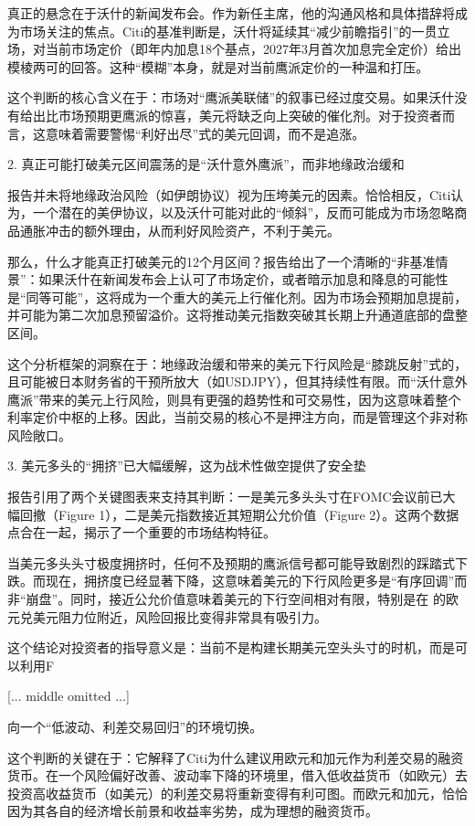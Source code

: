 \documentclass[11pt]{ctexart}
\begin{document}
真正的悬念在于沃什的新闻发布会。作为新任主席，他的沟通风格和具体措辞将成为市场关注的焦点。Citi的基准判断是，沃什将延续其“减少前瞻指引”的一贯立场，对当前市场定价（即年内加息18个基点，2027年3月首次加息完全定价）给出模棱两可的回答。这种“模糊”本身，就是对当前鹰派定价的一种温和打压。

这个判断的核心含义在于：市场对“鹰派美联储”的叙事已经过度交易。如果沃什没有给出比市场预期更鹰派的惊喜，美元将缺乏向上突破的催化剂。对于投资者而言，这意味着需要警惕“利好出尽”式的美元回调，而不是追涨。

2. 真正可能打破美元区间震荡的是“沃什意外鹰派”，而非地缘政治缓和

报告并未将地缘政治风险（如伊朗协议）视为压垮美元的因素。恰恰相反，Citi认为，一个潜在的美伊协议，以及沃什可能对此的“倾斜”，反而可能成为市场忽略商品通胀冲击的额外理由，从而利好风险资产，不利于美元。

那么，什么才能真正打破美元的12个月区间？报告给出了一个清晰的“非基准情景”：如果沃什在新闻发布会上认可了市场定价，或者暗示加息和降息的可能性是“同等可能”，这将成为一个重大的美元上行催化剂。因为市场会预期加息提前，并可能为第二次加息预留溢价。这将推动美元指数突破其长期上升通道底部的盘整区间。

这个分析框架的洞察在于：地缘政治缓和带来的美元下行风险是“膝跳反射”式的，且可能被日本财务省的干预所放大（如USDJPY），但其持续性有限。而“沃什意外鹰派”带来的美元上行风险，则具有更强的趋势性和可交易性，因为这意味着整个利率定价中枢的上移。因此，当前交易的核心不是押注方向，而是管理这个非对称风险敞口。

3. 美元多头的“拥挤”已大幅缓解，这为战术性做空提供了安全垫

报告引用了两个关键图表来支持其判断：一是美元多头头寸在FOMC会议前已大幅回撤（Figure 1），二是美元指数接近其短期公允价值（Figure 2）。这两个数据点合在一起，揭示了一个重要的市场结构特征。

当美元多头头寸极度拥挤时，任何不及预期的鹰派信号都可能导致剧烈的踩踏式下跌。而现在，拥挤度已经显著下降，这意味着美元的下行风险更多是“有序回调”而非“崩盘”。同时，接近公允价值意味着美元的下行空间相对有限，特别是在 的欧元兑美元阻力位附近，风险回报比变得非常具有吸引力。

这个结论对投资者的指导意义是：当前不是构建长期美元空头头寸的时机，而是可以利用F

[... middle omitted ...]

向一个“低波动、利差交易回归”的环境切换。

这个判断的关键在于：它解释了Citi为什么建议用欧元和加元作为利差交易的融资货币。在一个风险偏好改善、波动率下降的环境里，借入低收益货币（如欧元）去投资高收益货币（如美元）的利差交易将重新变得有利可图。而欧元和加元，恰恰因为其各自的经济增长前景和收益率劣势，成为理想的融资货币。
\end{document}
